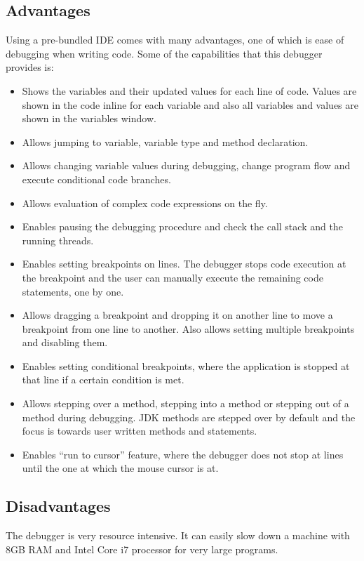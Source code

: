 \documentclass[paper=a4, fontsize=11pt,twoside]{scrartcl}	%
\begin{document}
    \subsection{Advantages}
    Using a pre-bundled IDE comes with many advantages, one of which is ease of debugging when writing code. Some of the capabilities that this debugger provides is:
    \begin{itemize}
        \item Shows the variables and their updated values for each line of code. Values are shown in the code inline for each variable and also all variables and values are shown in the variables window.
        \item Allows jumping to variable, variable type and method declaration.
        \item Allows changing variable values during debugging, change program flow and execute conditional code branches.
        \item Allows evaluation of complex code expressions on the fly.
        \item Enables pausing the debugging procedure and check the call stack and the running threads.
        \item Enables setting breakpoints on lines. The debugger stops code execution at the breakpoint and the user can manually execute the remaining code statements, one by one.
        \item Allows dragging a breakpoint and dropping it on another line to move a breakpoint from one line to another. Also allows setting multiple breakpoints and disabling them.
        \item Enables setting conditional breakpoints, where the application is stopped at that line if a certain condition is met.
        \item Allows stepping over a method, stepping into a method or stepping out of a method during debugging. JDK methods are stepped over by default and the focus is towards user written methods and statements.
        \item Enables “run to cursor” feature, where the debugger does not stop at lines until the one at which the mouse cursor is at.
    \end{itemize}
    \subsection{Disadvantages}
    The debugger is very resource intensive. It can easily slow down a machine with 8GB RAM and Intel Core i7 processor for very large programs.
\end{document}
